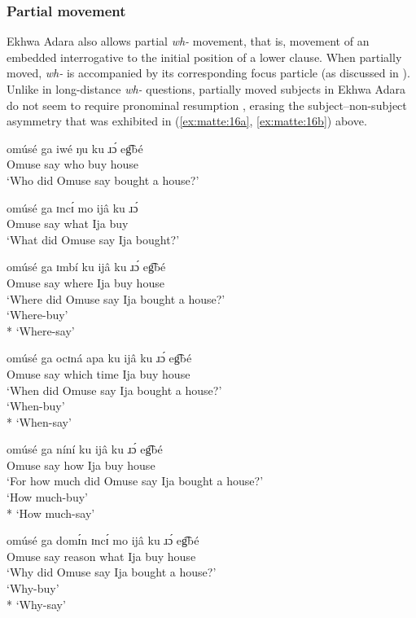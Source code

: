 \documentclass[output=paper,colorlinks,citecolor=brown
]{langscibook}
\begin{document}
\subsubsection{Partial movement} \label{sec:matte:3.2.3}

Ekhwa Adara also allows partial \textit{wh-} movement, that is, movement of an embedded interrogative to the initial position of a lower clause. When partially moved, \textit{wh-} is accompanied by its corresponding focus particle (as discussed in ). Unlike in long-distance \textit{wh-} questions, partially moved subjects in Ekhwa Adara do not seem to require pronominal resumption , erasing the subject–non-subject asymmetry that was exhibited in (\ref{ex:matte:16a}, \ref{ex:matte:16b}) above.

\ea \label{ex:matte:17}
\begin{xlist}

\ex \label{ex:matte:17a}
\gll omúsé ga iwé ŋu {\longrule} ku ɹɔ́ eg͡bé\\
Omuse say who \Foc{} {} \Pfv{} buy house\\
\glt `Who did Omuse say bought a house?'

\ex \label{ex:matte:17b}
\gll omúsé ga ɪncɪ́ mo ijâ ku ɹɔ́ {\longrule}\\
Omuse say what \Foc{} Ija \Pfv{} buy {}\\
\glt `What did Omuse say Ija bought?'

\ex \label{ex:matte:17c}
\gll omúsé ga ɪmbí ku ijâ ku ɹɔ́ eg͡bé {\longrule}\\
Omuse say where \Foc{} Ija \Pfv{} buy house {}\\
\glt `Where did Omuse say Ija bought a house?'\\
\langscicheckmark `Where-buy'\\
* `Where-say'

\ex \label{ex:matte:17d}
\gll omúsé ga ocɪná apa ku ijâ ku ɹɔ́ eg͡bé {\longrule}\\
Omuse say which time \Foc{} Ija \Pfv{} buy house\ {}\\
\glt `When did Omuse say Ija bought a house?'\\
\langscicheckmark `When-buy'\\
* `When-say'

\ex \label{ex:matte:17e}
\gll omúsé ga níní ku ijâ ku ɹɔ́ eg͡bé {\longrule}\\
Omuse say how \Foc{} Ija \Pfv{} buy house {}\\
\glt `For how much did Omuse say Ija bought a house?'\\
\langscicheckmark `How much-buy'\\
* `How much-say'

\ex \label{ex:matte:17f}
\gll omúsé ga domɪ́n ɪncɪ́ mo ijâ ku ɹɔ́ eg͡bé {\longrule}\\
Omuse say reason what \Foc{} Ija \Pfv{} buy house {}\\
\glt `Why did Omuse say Ija bought a house?'\\
\langscicheckmark `Why-buy'\\
* `Why-say'

\end{xlist}
\z
\end{document}
